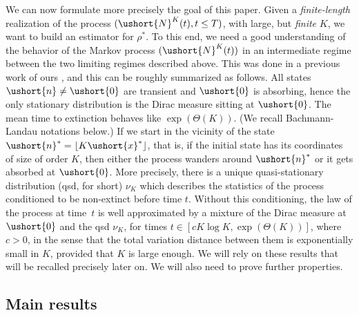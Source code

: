 \documentclass[JEP,XML,SOM,Unicode]{cedram}
\numberwithin{equation}{section}
\theoremstyle{plain}
\theoremstyle{definition}
\newcommand{\vecn}{\ushort{n}}
\newcommand{\vecnf}{\ushort{n}^*}
\newcommand{\vecxf}{\ushort{x}^*}
\newcommand{\veczer}{\ushort{0}}
\newcommand{\res}{\rho^*}
\newcommand{\leproc}{\ushort{N}^{K}}
\newcommand{\nuk}{\nu_{K}}\let\snuk\nuk
\begin{document}
We can now formulate more precisely the goal of this paper.
Given a \emph{finite-length} realization of the process $(\leproc(t), t\leq T)$, with large, but \emph{finite} $K$, we want to build an
estimator for $\res$.
To this end, we need a good understanding of the behavior of the Markov process $(\leproc(t))$ in an intermediate regime between the
two limiting regimes described above. This was done in a previous work of ours \cite{ccm2}, and this can be roughly summarized as follows.
All states $\vecn\neq \veczer$ are transient and $\veczer$ is absorbing, hence the only stationary distribution is the Dirac measure sitting at
$\veczer$. The mean time to extinction behaves like $\exp(\Theta(K))$. (We recall Bachmann-Landau notations below.)
If we start in the vicinity of the state $\vecnf = \lfloor K\vecxf\rfloor$, that is, if the initial state has its coordinates of size of order $K$,
then either the process wanders around $\vecnf$ or it gets absorbed at $\veczer$.
More precisely, there is a unique quasi-stationary distribution (qsd, for short) $\nuk$ which describes the statistics of the process conditioned
to be non-extinct before time $t$. Without this conditioning, the law of the process at time~$t$ is well approximated by a mixture of the
Dirac measure at $\veczer$ and the qsd $\nuk$, for times $t\in\left[c K\log K, \exp(\Theta(K))\right]$, where $c>0$, in the sense that the total variation
distance between them is exponentially small in $K$, provided that $K$ is large enough.
We will rely on these results that will be recalled precisely later on. We will also need to prove further properties.

\subsection{Main results}\label{subsec:main-results}
\end{document}
